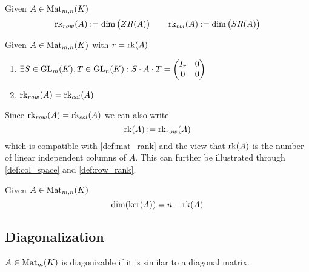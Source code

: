 \begin{definition}\label{def:row_rank}
   Given \(A \in \operatorname{Mat}_{m,n}(K)\)
   \[\operatorname{rk}_{row}(A) := \dim\big(ZR(A)\big) \qquad \operatorname{rk}_{col}(A) := \dim\big(SR(A)\big)\]
\end{definition}

\begin{proposition}\label{pro:SAT}
   Given \(A \in \operatorname{Mat}_{m,n}(K)\) with \(r = \operatorname{rk}(A)\)
   \begin{enumerate}[label=\roman*, align=Center]
      \item \(\exists S \in \operatorname{GL}_m(K), T \in \operatorname{GL}_n(K): S \cdot A \cdot T = \begin{pmatrix}I_r & 0\\ 0 & 0\end{pmatrix}\)
      \item \(\operatorname{rk}_{row}(A) = \operatorname{rk}_{col}(A)\)
   \end{enumerate}
\end{proposition}
\begin{remark}
   Since \(\operatorname{rk}_{row}(A) = \operatorname{rk}_{col}(A)\) we can also write
   \[\operatorname{rk}(A) := \operatorname{rk}_{row}(A)\]
   which is compatible with \cref{def:mat_rank} and the view that \(\operatorname{rk}(A)\) is the number of linear independent columns of \(A\).
   This can further be illustrated through \cref{def:col_space} and \cref{def:row_rank}.
\end{remark}

\begin{corollary}\label{cor:dim_ker}
   Given \(A \in \operatorname{Mat}_{m,n}(K)\)
   \[\dim(\ker(A)) = n - \operatorname{rk}(A)\]
\end{corollary}

\subsection{Diagonalization}
\begin{definition}
   \(A \in \operatorname{Mat}_m(K)\) is diagonizable if it is similar to a diagonal matrix.
\end{definition}

